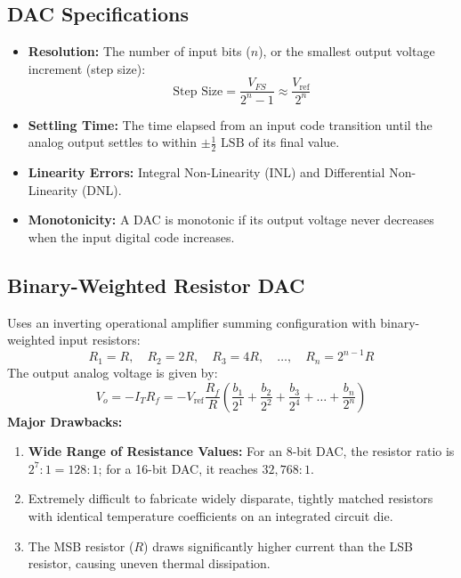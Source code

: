 \documentclass[12pt,a4paper]{article}
\begin{document}
\subsection{DAC Specifications}
\begin{itemize}[leftmargin=*, itemsep=3pt]
  \item \textbf{Resolution:} The number of input bits ($n$), or the smallest output voltage increment (step size):
  \begin{equation}
    \text{Step Size} = \frac{V_{FS}}{2^n - 1} \approx \frac{V_{\text{ref}}}{2^n}
  \end{equation}
  \item \textbf{Settling Time:} The time elapsed from an input code transition until the analog output settles to within $\pm \frac{1}{2}\text{ LSB}$ of its final value.
  \item \textbf{Linearity Errors:} Integral Non-Linearity (INL) and Differential Non-Linearity (DNL).
  \item \textbf{Monotonicity:} A DAC is monotonic if its output voltage never decreases when the input digital code increases.
\end{itemize}

\subsection{Binary-Weighted Resistor DAC}
Uses an inverting operational amplifier summing configuration with binary-weighted input resistors:
\begin{equation}
  R_1 = R, \quad R_2 = 2R, \quad R_3 = 4R, \quad \dots, \quad R_n = 2^{n-1}R
\end{equation}
The output analog voltage is given by:
\begin{equation}
  V_o = -I_T R_f = -V_{\text{ref}} \frac{R_f}{R} \left( \frac{b_1}{2^1} + \frac{b_2}{2^2} + \frac{b_3}{2^4} + \dots + \frac{b_n}{2^n} \right)
\end{equation}
\textbf{Major Drawbacks:}
\begin{enumerate}[label=\arabic*., leftmargin=*]
  \item \textbf{Wide Range of Resistance Values:} For an 8-bit DAC, the resistor ratio is $2^7 : 1 = 128 : 1$; for a 16-bit DAC, it reaches $32{,}768 : 1$.
  \item Extremely difficult to fabricate widely disparate, tightly matched resistors with identical temperature coefficients on an integrated circuit die.
  \item The MSB resistor ($R$) draws significantly higher current than the LSB resistor, causing uneven thermal dissipation.
\end{enumerate}
\end{document}
